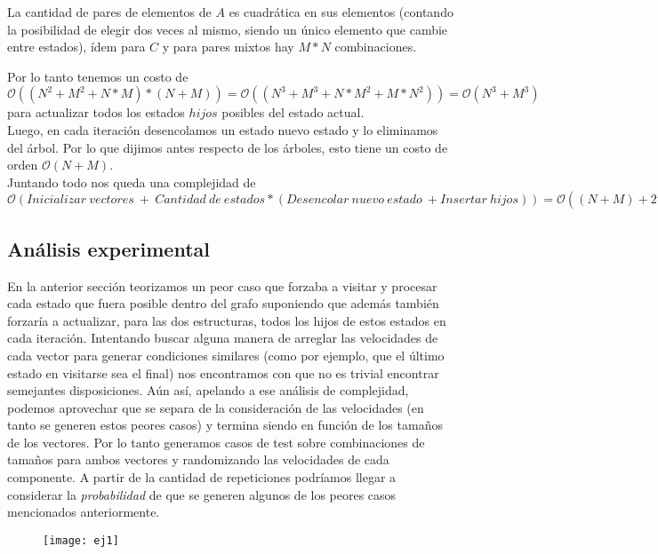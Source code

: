 La cantidad de pares de elementos de $A$ es cuadrática en sus elementos (contando la posibilidad de elegir dos veces al mismo, siendo un único elemento que cambie entre estados), ídem para $C$ y para pares mixtos hay $M*N$ combinaciones.

Por lo tanto tenemos un costo de $\mathcal{O}((N^2+M^2+N*M)*(N+M))=\mathcal{O}((N^3+M^3+N*M^2+M*N^2))=\mathcal{O}(N^3+M^3)$ para actualizar todos los estados $hijos$ posibles del estado actual. \\

Luego, en cada iteración desencolamos un estado nuevo estado y lo eliminamos del árbol. Por lo que dijimos antes respecto de los árboles, esto tiene un costo de orden $\mathcal{O}(N+M)$. \\

Juntando todo nos queda una complejidad de $\mathcal{O}(Inicializar\ vectores\ +\ Cantidad\ de\ estados*(Desencolar\ nuevo\ estado\ + Insertar\ hijos)) = \mathcal{O}((N+M)+2^{N+M}((N+M)+(N^3+M^3))) = \mathcal{O}(\ 2^{N+M}*(N^3+M^3)\ )$

\subsection{Análisis experimental}

En la anterior sección teorizamos un peor caso que forzaba a visitar y procesar cada estado que fuera posible dentro del grafo suponiendo que además también forzaría a actualizar, para las dos estructuras, todos los hijos de estos estados en cada iteración. Intentando buscar alguna manera de arreglar las velocidades de cada vector para generar condiciones similares (como por ejemplo, que el último estado en visitarse sea el final) nos encontramos con que no es trivial encontrar semejantes disposiciones. Aún así, apelando a ese análisis de complejidad, podemos aprovechar que se separa de la consideración de las velocidades (en tanto se generen estos peores casos) y termina siendo en función de los tamaños de los vectores. Por lo tanto generamos casos de test sobre combinaciones de tamaños para ambos vectores y randomizando las velocidades de cada componente. A partir de la cantidad de repeticiones podríamos llegar a considerar la \emph{probabilidad} de que se generen algunos de los peores casos mencionados anteriormente.	
\\
	
	\begin{figure}[H]
		\centering
		\texttt{[image: ej1]}
	\end{figure}

